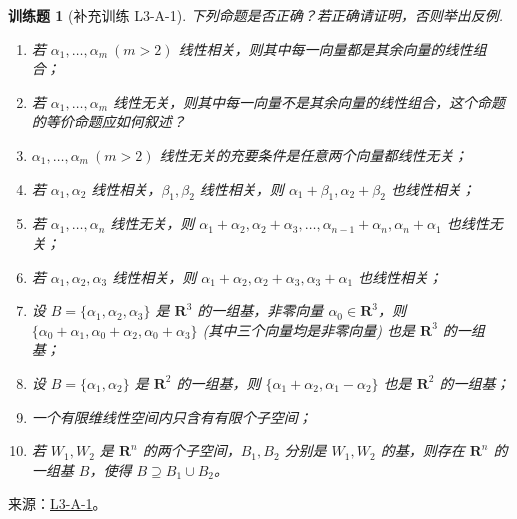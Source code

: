 \documentclass[UTF8,12pt,a4paper,fontset=fandol]{ctexart}
\newtheorem{exercise}{训练题}[section]
\begin{document}
\begin{exercise}[补充训练 L3-A-1]\label{prob:L3-A-1}
下列命题是否正确？若正确请证明，否则举出反例.
        \begin{enumerate}
            \item 若 $\alpha_1, \ldots, \alpha_m \ (m > 2)$ 线性相关，则其中每一向量都是其余向量的线性组合；

            \item 若 $\alpha_1, \ldots, \alpha_m$ 线性无关，则其中每一向量不是其余向量的线性组合，这个命题的等价命题应如何叙述？

            \item $\alpha_1, \ldots, \alpha_m \ (m > 2)$ 线性无关的充要条件是任意两个向量都线性无关；

            \item  若 $\alpha_1, \alpha_2$ 线性相关，$ \beta_1, \beta_2$ 线性相关，则 $\alpha_1 + \beta_1, \alpha_2 + \beta_2$ 也线性相关；

            \item 若 $\alpha_1, \ldots, \alpha_n$ 线性无关，则 $\alpha_1 + \alpha_2, \alpha_2 + \alpha_3, \ldots, \alpha_{n-1} + \alpha_n, \alpha_n + \alpha_1$ 也线性无关；

            \item 若 $\alpha_1, \alpha_2, \alpha_3$ 线性相关，则 $\alpha_1 + \alpha_2, \alpha_2 + \alpha_3, \alpha_3 + \alpha_1$ 也线性相关；

            \item 设 $B = \{\alpha_1, \alpha_2, \alpha_3\}$ 是 $ \mathbf{R}^3 $ 的一组基，非零向量 $\alpha_0 \in \mathbf{R}^3$，则 $\{\alpha_0 + \alpha_1, \alpha_0 + \alpha_2, \alpha_0 + \alpha_3\}$ (其中三个向量均是非零向量) 也是 $\mathbf{R}^3$ 的一组基；

            \item  设 $B = \{\alpha_1, \alpha_2\}$ 是 $\mathbf{R}^2$ 的一组基，则 $\{\alpha_1 + \alpha_2, \alpha_1 - \alpha_2\}$ 也是 $\mathbf{R}^2$ 的一组基；

            \item 一个有限维线性空间内只含有有限个子空间；

            \item  若 $W_1, W_2$ 是 $ \mathbf{R}^n $ 的两个子空间，$B_1, B_2$ 分别是 $W_1, W_2$ 的基，则存在 $ \mathbf{R}^n $ 的一组基 $B$，使得 $B \supseteq B_1 \cup B_2$。

        \end{enumerate}
\end{exercise}
\noindent 来源：\href{https://github.com/yhwu-is/Linear-Algebra-Left-Undone/blob/new/%E8%AE%B2%E4%B9%89/%E4%B8%93%E9%A2%98/3%20%E6%9C%89%E9%99%90%E7%BB%B4%E7%BA%BF%E6%80%A7%E7%A9%BA%E9%97%B4.tex}{L3-A-1}。
\end{document}

